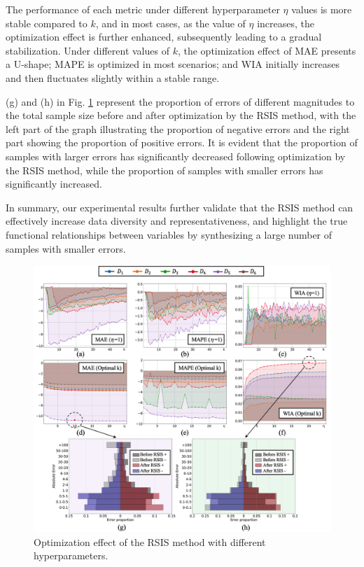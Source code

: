 \documentclass[lettersize,journal]{IEEEtran}
\begin{document}
The performance of each metric under different hyperparameter 
$\eta$ values is more stable compared to $k$, and in most cases, 
as the value of $\eta$ increases, the optimization effect is 
further enhanced, subsequently leading to a gradual stabilization. 
Under different values of $k$, the optimization effect of MAE 
presents a U-shape; MAPE is optimized in most scenarios; and 
WIA initially increases and then fluctuates slightly within a 
stable range.

(g) and (h) in Fig. \ref{Fig5} represent the proportion of errors 
of different magnitudes to the total sample size before and after 
optimization by the RSIS method, with the left part of the graph 
illustrating the proportion of negative errors and the right part 
showing the proportion of positive errors. It is evident that the 
proportion of samples with larger errors has significantly 
decreased following optimization by the RSIS method, while the 
proportion of samples with smaller errors has significantly 
increased. 

In summary, our experimental results further validate that the 
RSIS method can effectively increase data diversity and representativeness, 
and highlight the true functional relationships between variables by synthesizing 
a large number of samples with smaller errors.

\begin{figure}[!t]
  \centering
  \includegraphics[width=5.0in]{Fig5.png}
  \caption{Optimization effect of the RSIS method with different 
  hyperparameters.}
  \label{Fig5}
\end{figure}
\end{document}
